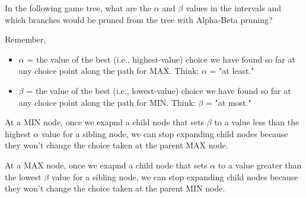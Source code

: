\begin{questions}

\fi



\newpage

\question In the following game tree, what are the $\alpha$ and $\beta$ values in the intervals and which branches would be pruned from the tree with Alpha-Beta pruning?

\ifprintanswers
Remember,
\vspace{-.1in}
\begin{itemize}
\item $\alpha$ = the value of the best (i.e., highest-value) choice we have found so far at any choice point along the path for MAX.  Think: $\alpha$ = "at least."

\item $\beta$ = the value of the best (i.e., lowest-value) choice we have found so far at any choice point along the path for MIN.  Think: $\beta$ = "at most."
\end{itemize}

\vspace{-.05in}

At a MIN node, once we exapnd a child node that sets $\beta$ to a value less than the highest $\alpha$ value for a sibling node, we can stop expanding child nodes because they won't change the choice taken at the parent MAX node.

At a MAX node, once we exapnd a child node that sets $\alpha$ to a value greater than the lowest $\beta$ value for a sibling node, we can stop expanding child nodes because they won't change the choice taken at the parent MIN node.



\end{questions}
